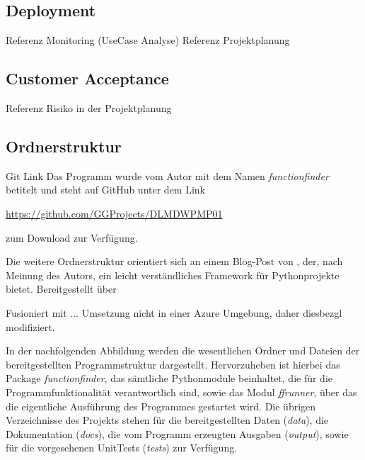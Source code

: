 \subsection{Deployment}
Referenz Monitoring (UseCase Analyse)
Referenz Projektplanung

\subsection{Customer Acceptance}
Referenz Risiko in der Projektplanung

\subsection{Ordnerstruktur}

Git Link
Das Programm wurde vom Autor mit dem Namen \emph{\glqq functionfinder\grqq} betitelt und steht auf GitHub unter dem Link \begin{center}\url{https://github.com/GGProjects/DLMDWPMP01}\end{center} zum Download zur Verfügung.

 Die weitere Ordnerstruktur orientiert sich an einem Blog-Post von \cite{henk_griffioen_how_2017}, der, nach Meinung des Autors, ein leicht verständliches Framework für Pythonprojekte bietet. Bereitgestellt über \citep{griffioen_hgrifexample-project_2023}

Fusioniert mit \citep{noauthor_azureazure-tdsp-projecttemplate_2025} \colorbox{hellrot}{...}
Umsetzung nicht in einer Azure Umgebung, daher diesbezgl modifiziert.



In der nachfolgenden Abbildung werden die wesentlichen Ordner und Dateien der bereitgestellten Programmstruktur dargestellt. Hervorzuheben ist hierbei das Package \emph{functionfinder}, das sämtliche Pythonmodule beinhaltet, die für die Programmfunktionalität verantwortlich sind, sowie das Modul \emph{ffrunner}, über das die eigentliche Ausführung des Programmes gestartet wird.
Die übrigen Verzeichnisse des Projekts stehen für die bereitgestellten Daten (\emph{data}), die Dokumentation (\emph{docs}), die vom Programm erzeugten Ausgaben (\emph{output}), sowie für die vorgesehenen UnitTests (\emph{tests}) zur Verfügung.


